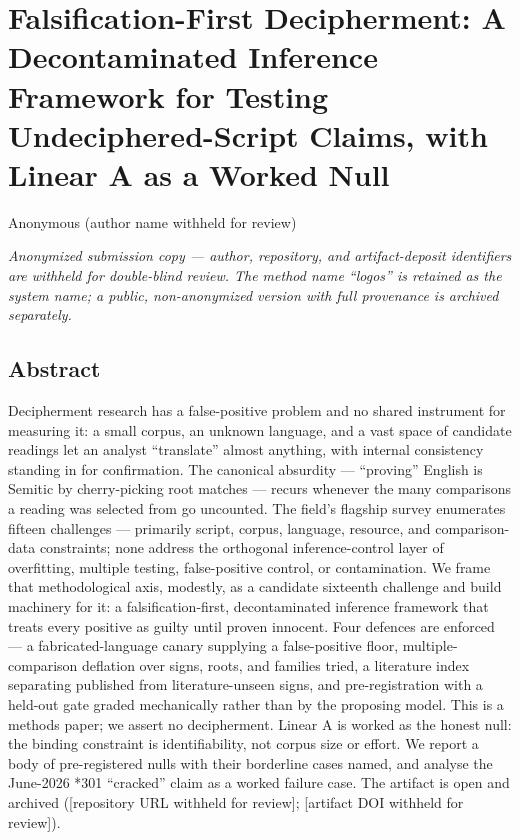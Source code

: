 \documentclass[
  10pt,
]{article}
\author{}
\date{}
\begin{document}
\hypertarget{falsification-first-decipherment-a-decontaminated-inference-framework-for-testing-undeciphered-script-claims-with-linear-a-as-a-worked-null}{%
\section{Falsification-First Decipherment: A Decontaminated Inference
Framework for Testing Undeciphered-Script Claims, with Linear A as a
Worked
Null}\label{falsification-first-decipherment-a-decontaminated-inference-framework-for-testing-undeciphered-script-claims-with-linear-a-as-a-worked-null}}

Anonymous (author name withheld for review)

\emph{Anonymized submission copy --- author, repository, and
artifact-deposit identifiers are withheld for double-blind review. The
method name ``logos'' is retained as the system name; a public,
non-anonymized version with full provenance is archived separately.}

\hypertarget{abstract}{%
\subsection{Abstract}\label{abstract}}

Decipherment research has a false-positive problem and no shared
instrument for measuring it: a small corpus, an unknown language, and a
vast space of candidate readings let an analyst ``translate'' almost
anything, with internal consistency standing in for confirmation. The
canonical absurdity --- ``proving'' English is Semitic by cherry-picking
root matches --- recurs whenever the many comparisons a reading was
selected from go uncounted. The field's flagship survey enumerates
fifteen challenges --- primarily script, corpus, language, resource, and
comparison-data constraints; none address the orthogonal
inference-control layer of overfitting, multiple testing, false-positive
control, or contamination. We frame that methodological axis, modestly,
as a candidate sixteenth challenge and build machinery for it: a
falsification-first, decontaminated inference framework that treats
every positive as guilty until proven innocent. Four defences are
enforced --- a fabricated-language canary supplying a false-positive
floor, multiple-comparison deflation over signs, roots, and families
tried, a literature index separating published from literature-unseen
signs, and pre-registration with a held-out gate graded mechanically
rather than by the proposing model. This is a methods paper; we assert
no decipherment. Linear A is worked as the honest null: the binding
constraint is identifiability, not corpus size or effort. We report a
body of pre-registered nulls with their borderline cases named, and
analyse the June-2026 *301 ``cracked'' claim as a worked failure case.
The artifact is open and archived ({[}repository URL withheld for
review{]}; {[}artifact DOI withheld for review{]}).
\end{document}
